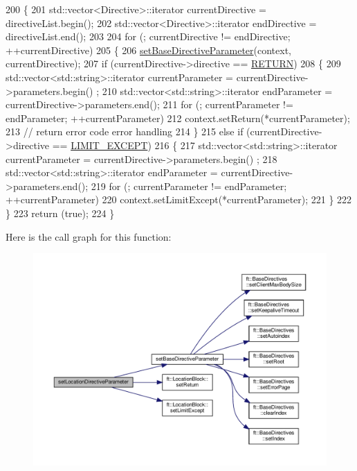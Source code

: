 \begin{DoxyCode}
200     \{
201         std::vector<Directive>::iterator    currentDirective = directiveList.begin();
202         std::vector<Directive>::iterator    endDirective = directiveList.end();
203 
204         \textcolor{keywordflow}{for} (; currentDirective != endDirective; ++currentDirective)
205         \{
206             \hyperlink{classft_1_1_parser_a9f412d172694519d0d8dd9edacd257c0}{setBaseDirectiveParameter}(context, currentDirective);
207             \textcolor{keywordflow}{if} (currentDirective->directive == \hyperlink{namespaceft_a5a5554dff10f0dc50bae4cc5825ad75da520e09ffec033636dba711f3441cc600}{RETURN})
208             \{
209                 std::vector<std::string>::iterator  currentParameter = currentDirective->parameters.begin()
      ;
210                 std::vector<std::string>::iterator      endParameter = currentDirective->parameters.end();
211                 \textcolor{keywordflow}{for} (; currentParameter != endParameter; ++currentParameter)
212                     context.setReturn(*currentParameter);
213                 \textcolor{comment}{// return error code error handling}
214             \}
215             \textcolor{keywordflow}{else} \textcolor{keywordflow}{if} (currentDirective->directive == \hyperlink{namespaceft_a5a5554dff10f0dc50bae4cc5825ad75da25b0e84438d71cc28e97f17a01cfde7a}{LIMIT\_EXCEPT})
216             \{
217                 std::vector<std::string>::iterator  currentParameter = currentDirective->parameters.begin()
      ;
218                 std::vector<std::string>::iterator      endParameter = currentDirective->parameters.end();
219                 \textcolor{keywordflow}{for} (; currentParameter != endParameter; ++currentParameter)
220                     context.setLimitExcept(*currentParameter);
221             \}
222         \}
223         \textcolor{keywordflow}{return} (\textcolor{keyword}{true});
224     \}
\end{DoxyCode}
Here is the call graph for this function\+:
\nopagebreak
\begin{figure}[H]
\begin{center}
\leavevmode
\includegraphics[width=350pt]{classft_1_1_parser_a82bee2278db1afa69bbb6eb6f192743c_cgraph}
\end{center}
\end{figure}
